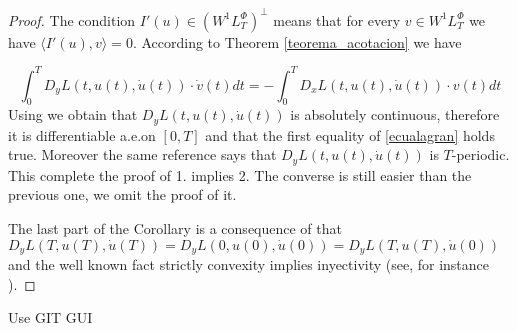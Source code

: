 \documentclass[twoside]{article}
\newcommand{\lphi}{L^{\Phi}}
\newcommand{\wphi}{W^{1}\lphi}
\begin{document}
\begin{proof} The condition $I'(u)\in\left( \wphi_T\right)^{\perp}$ means that for every $v\in \wphi_T$ we have $\langle I'(u),v\rangle=0$. According to Theorem
\ref{teorema_acotacion} we have

\[\int_0^TD_yL(t,u(t),\dot{u}(t))\cdot \dot{v}(t)dt=-\int_0^TD_xL(t,u(t),\dot{u}(t))\cdot v(t)dt \]
Using \cite[pag. 6]{mawhin2010critical} we obtain that $D_yL(t,u(t),\dot{u}(t))$ is absolutely continuous, therefore it is differentiable a.e.on $[0,T]$ and that the first equality 
of \ref{ecualagran} holds true. Moreover the same reference says that $D_yL(t,u(t),\dot{u}(t))$ is $T$-periodic. 
This complete the proof of 1. implies 2. The converse is still easier than the previous one, we omit the proof of it. 

The last part of the Corollary is a consequence of that $D_yL(T,u(T),\dot{u}(T))=D_yL(0,u(0),\dot{u}(0))=D_yL(T,u(T),\dot{u}(0))$ and the well known fact
strictly convexity implies inyectivity (see, for instance \cite[Theorem
12.17]{rockafellar2009variational}).



\end{proof}

Use GIT GUI









\end{document}
